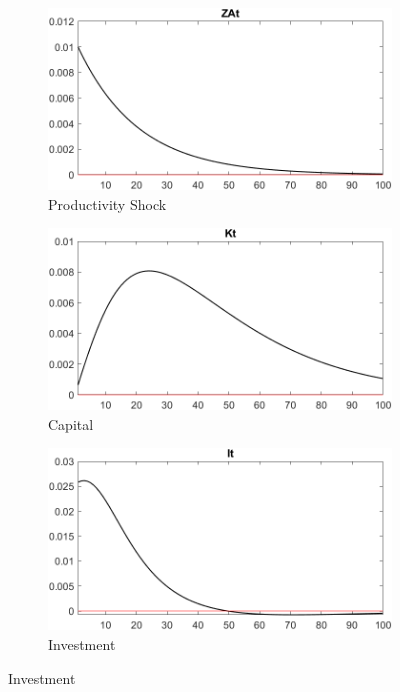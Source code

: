 \documentclass[
	12pt, 
	]{article}
\numberwithin{equation}{section}
\theoremstyle{definition}
\theoremstyle{plain}
\theoremstyle{plain}
\theoremstyle{plain}
\begin{document}
\begin{figure}[h!]
	\centering
\begin{subfigure}[b]{0.3\textwidth}
	\centering
	\includegraphics[width=\textwidth]{shock_ZAt/shock_ZAt_ZAt}
	\caption{Productivity Shock}
	\label{fig:zat-productivity-shock}
\end{subfigure}
\hfill
\begin{subfigure}[b]{0.3\textwidth}
	\centering
	\includegraphics[width=\textwidth]{shock_ZAt/shock_ZAt_Kt}
	\caption{Capital}
	\label{fig:zat-capital}
\end{subfigure}
\hfill
\begin{subfigure}[b]{0.3\textwidth}
	\centering
	\includegraphics[width=\textwidth]{shock_ZAt/shock_ZAt_It}
	\caption{Investment}
	\label{fig:zat-investment}
\end{subfigure}
\hfill


\end{figure}
\end{document}
